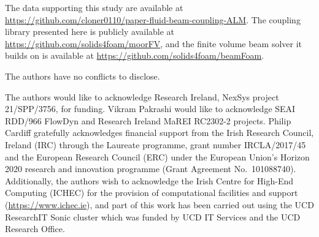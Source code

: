 \documentclass[sn-mathphys,Numbered]{sn-jnl}%
\begin{document}








\backmatter

\noindent
The data supporting this study are available at
\url{https://github.com/cloner0110/paper-fluid-beam-coupling-ALM}.
The coupling library presented here is publicly available at
\url{https://github.com/solids4foam/moorFV}, and the finite volume beam solver it builds on
is available at \url{https://github.com/solids4foam/beamFoam}.

\noindent
The authors have no conflicts to disclose.

\noindent
The authors would like to acknowledge Research Ireland, NexSys project 21/SPP/3756, for
funding. Vikram Pakrashi would like to acknowledge SEAI RDD/966 FlowDyn and Research
Ireland MaREI RC2302-2 projects. Philip Cardiff gratefully acknowledges financial support
from the Irish Research Council, Ireland (IRC) through the Laureate programme, grant
number IRCLA/2017/45 and the European Research Council (ERC) under the European
Union's Horizon 2020 research and innovation programme (Grant Agreement No.\ 101088740).
Additionally, the authors wish to acknowledge the Irish Centre for High-End Computing
(ICHEC) for the provision of computational facilities and support
(\url{https://www.ichec.ie}), and part of this work has been carried out using the UCD
ResearchIT Sonic cluster which was funded by UCD IT Services and the UCD Research Office.


\end{document}
